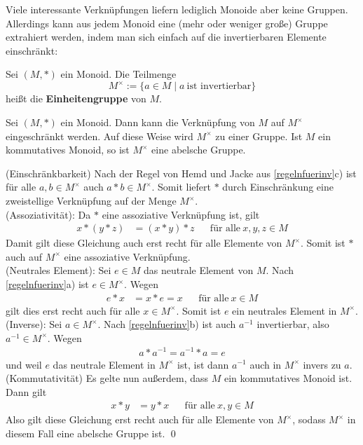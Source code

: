 \noindent Viele interessante Verknüpfungen liefern lediglich Monoide aber keine Gruppen. Allerdings kann aus jedem Monoid eine (mehr oder weniger große) Gruppe extrahiert werden, indem man sich einfach auf die invertierbaren Elemente einschränkt:


\begin{de} 
    Sei $(M,*)$ ein Monoid. Die Teilmenge
        \[ M^\times := \{a\in M\mid a\ \text{ist invertierbar} \} \]
    heißt die \textbf{Einheitengruppe} von $M$.
\end{de}


\begin{satz} \label{einheitengruppe}
    Sei $(M,*)$ ein Monoid. Dann kann die Verknüpfung von $M$ auf $M^\times$ eingeschränkt werden. Auf diese Weise wird $M^\times$ zu einer Gruppe. Ist $M$ ein kommutatives Monoid, so ist $M^\times$ eine abelsche Gruppe.
\end{satz}


\begin{bew}
    (Einschränkbarkeit) Nach der Regel von Hemd und Jacke aus \cref{regelnfuerinv}c) ist für alle $a,b\in M^\times$ auch $a*b\in M^\times$. Somit liefert $*$ durch Einschränkung eine zweistellige Verknüpfung auf der Menge $M^\times$. \\[0.5em]
    (Assoziativität): Da $*$ eine assoziative Verknüpfung ist, gilt
    \begin{align*}
        x*(y*z) & = (x*y)*z && \text{für alle}\ x,y,z\in M
    \end{align*}
    Damit gilt diese Gleichung auch erst recht für alle Elemente von $M^\times$. Somit ist $*$ auch auf $M^\times$ eine assoziative Verknüpfung. \\[0.5em]
    (Neutrales Element): Sei $e\in M$ das neutrale Element von $M$. Nach \cref{regelnfuerinv}a) ist $e\in M^\times$. Wegen
    \begin{align*}
        e*x& =x*e=x && \text{für alle}\ x\in M
    \end{align*}
    gilt dies erst recht auch für alle $x\in M^\times$. Somit ist $e$ ein neutrales Element in $M^\times$. \\[0.5em]
    (Inverse): Sei $a\in M^\times$. Nach \cref{regelnfuerinv}b) ist auch $a^{-1}$ invertierbar, also $a^{-1}\in M^\times$. Wegen
    \begin{align*}
        a*a^{-1}=a^{-1}*a=e
    \end{align*}
    und weil $e$ das neutrale Element in $M^\times$ ist, ist dann $a^{-1}$ auch in $M^\times$ invers zu $a$. \\[0.5em]
    (Kommutativität) Es gelte nun außerdem, dass $M$ ein kommutatives Monoid ist. Dann gilt
    \begin{align*}
        x*y & = y*x && \text{für alle}\ x,y\in M
    \end{align*}
    Also gilt diese Gleichung erst recht auch für alle Elemente von $M^\times$, sodass $M^\times$ in diesem Fall eine abelsche Gruppe ist. \qed
\end{bew}


